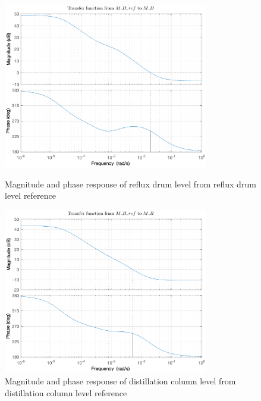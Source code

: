 \documentclass[12pt]{article}
\begin{document}
\begin{figure}
\centering
\includegraphics[width=0.8\textwidth]{../Systemanalyse/Log_Data_to_Matlab/Figurer/Identifisering/MD_bode.eps}
\caption{Magnitude and phase response of reflux drum level from reflux drum level reference}
\label{fig:L11}

\includegraphics[width=0.8\textwidth]{../Systemanalyse/Log_Data_to_Matlab/Figurer/Identifisering/MB_bode.eps}
\caption{Magnitude and phase response of distillation column level from distillation column level reference}
\label{fig:L22}
\end{figure}
\end{document}
